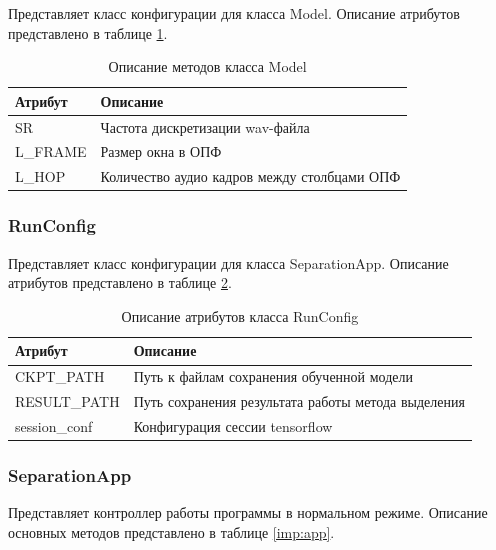 Представляет класс конфигурации для класса Model. Описание атрибутов представлено в таблице \ref{imp:modelconfig}.

\begin{table}[h]
	\caption{\label{imp:modelconfig}Описание методов класса Model}
	\begin{center}
		\begin{tabular}{|p{}|p{}|}
			\hline
			Атрибут & Описание \\
			\hline
			SR & Частота дискретизации wav-файла \\	
			\hline
			L\_FRAME & Размер окна в ОПФ \\
			\hline
			L\_HOP & Количество аудио кадров между столбцами ОПФ \\
			\hline
		\end{tabular}
	\end{center}
\end{table}

\subsubsection*{RunConfig}

Представляет класс конфигурации для класса SeparationApp. Описание атрибутов представлено в таблице \ref{imp:runconfig}.

\begin{table}[h]
	\caption{\label{imp:runconfig}Описание атрибутов класса RunConfig}
	\begin{center}
		\begin{tabular}{|p{}|p{}|}
			\hline
			Атрибут & Описание \\
			\hline
			CKPT\_PATH & Путь к файлам сохранения обученной модели \\	
			\hline
			RESULT\_PATH & Путь сохранения результата работы метода выделения \\
			\hline
			session\_conf & Конфигурация сессии tensorflow \\
			\hline
		\end{tabular}
	\end{center}
\end{table}

\subsubsection*{SeparationApp}

Представляет контроллер работы программы в нормальном режиме. Описание основных методов представлено в таблице \ref{imp:app}.


